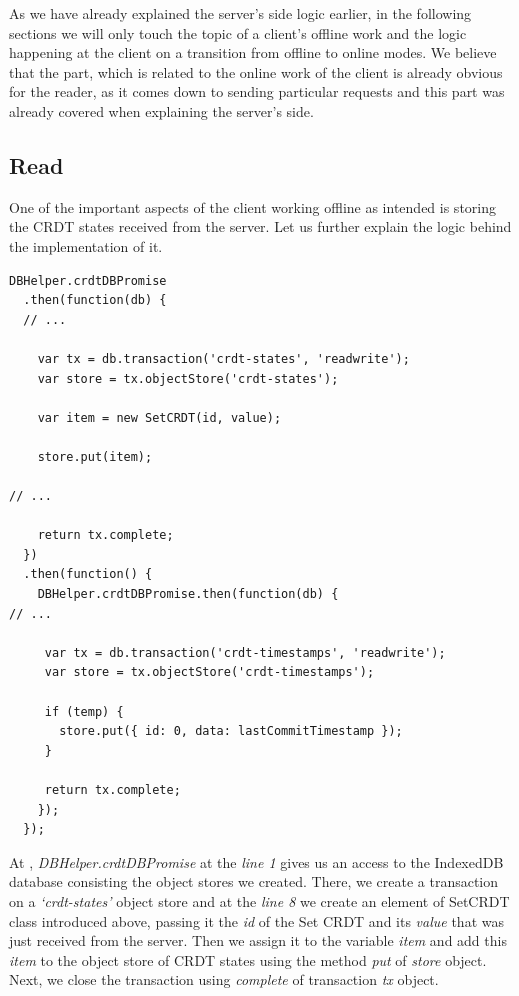 As we have already explained the server's side logic earlier, in the following sections we will only touch the topic of a client's offline work and the logic happening  at the client on a transition from offline to online modes. We believe that the part, which is related to the online work of the client is already obvious for the reader, as it comes down to sending particular requests and this part was already covered when explaining the server's side. 

\subsection*{Read}

One of the important aspects of the client working offline as intended is storing the CRDT states received from the server. Let us further explain the logic behind the implementation of it.

\begin{lstlisting}[caption={Storing CRDT states in cache after a successful request from the server.}, label={lst:dev9}]
DBHelper.crdtDBPromise
  .then(function(db) {
  // ...

    var tx = db.transaction('crdt-states', 'readwrite');
    var store = tx.objectStore('crdt-states');

    var item = new SetCRDT(id, value);

    store.put(item);

// ...

    return tx.complete;
  })
  .then(function() {
    DBHelper.crdtDBPromise.then(function(db) {
// ...

     var tx = db.transaction('crdt-timestamps', 'readwrite');
     var store = tx.objectStore('crdt-timestamps');

     if (temp) {
       store.put({ id: 0, data: lastCommitTimestamp });
     }

     return tx.complete;
    });
  });
\end{lstlisting}

At , \textit{DBHelper.crdtDBPromise} at the \textit{line 1} gives us an access to the IndexedDB database consisting the object stores we created. There, we create a transaction on a \textit{`crdt-states'} object store and at the \textit{line 8} we create an element of SetCRDT class introduced above, passing it the \textit{id} of the Set CRDT and its \textit{value} that was just received from the server. Then we assign it to the variable \textit{item} and add this \textit{item} to the object store of CRDT states using the method \textit{put} of \textit{store} object. Next, we close the transaction using \textit{complete} of transaction \textit{tx} object.

